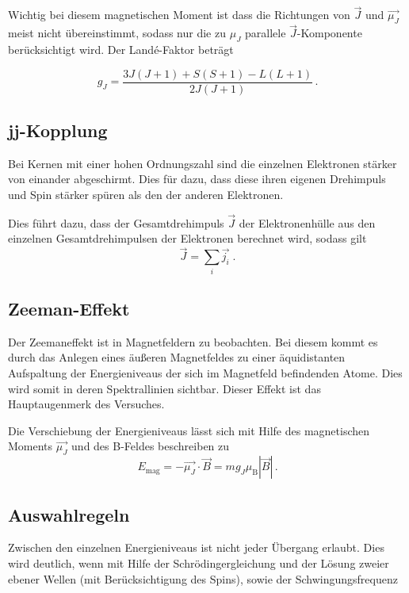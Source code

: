 \noindent
Wichtig bei diesem magnetischen Moment ist dass die Richtungen von $\vec{J}$ und $\vec{\mu_J}$ meist nicht übereinstimmt, sodass
nur die zu $\mu_J$ parallele $\vec{J}$-Komponente berücksichtigt wird. Der Landé-Faktor beträgt 

\begin{equation}
    g_J = \frac{3J(J+1) + S(S+1) - L(L+1)}{2J(J+1)}\, .
    \label{eqn:lande}
\end{equation}


\subsection{jj-Kopplung}

Bei Kernen mit einer hohen Ordnungszahl sind die einzelnen Elektronen stärker von einander abgeschirmt. Dies für dazu, dass diese ihren eigenen Drehimpuls und Spin stärker 
spüren als den der anderen Elektronen. 

\noindent
Dies führt dazu, dass der Gesamtdrehimpuls $\vec{J}$ der Elektronenhülle aus den einzelnen Gesamtdrehimpulsen der Elektronen berechnet wird, sodass gilt
\begin{equation}
    \vec{J} = \sum_i \vec{j_i} \; .
\end{equation}



\subsection{Zeeman-Effekt}
Der Zeemaneffekt ist in Magnetfeldern zu beobachten. Bei diesem kommt es durch das Anlegen eines äußeren Magnetfeldes zu einer äquidistanten Aufspaltung der Energieniveaus der sich im
Magnetfeld befindenden Atome. Dies wird somit in deren Spektrallinien sichtbar. Dieser Effekt ist das Hauptaugenmerk des Versuches.

\noindent
Die Verschiebung der Energieniveaus lässt sich mit Hilfe des magnetischen Moments $\vec{\mu_J}$ und des B-Feldes beschreiben zu 
\begin{equation}
    E_\text{mag} = - \vec{\mu_J} \cdot \vec{B} = m g_J \mu_\text{B} |\vec{B}| \, .
    \label{eqn:energie}
\end{equation} 

\subsection{Auswahlregeln}
Zwischen den einzelnen Energieniveaus ist nicht jeder Übergang erlaubt. Dies wird deutlich, wenn mit Hilfe der Schrödingergleichung und der Lösung zweier ebener Wellen (mit Berücksichtigung
des Spins), sowie der Schwingungsfrequenz

